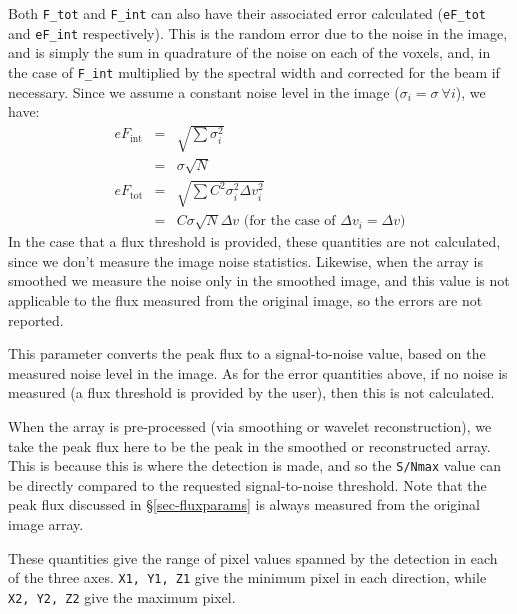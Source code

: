 
Both \texttt{F\_tot} and \texttt{F\_int} can also have their
associated error calculated (\texttt{eF\_tot} and \texttt{eF\_int}
respectively). This is the random error due to the noise in the image,
and is simply the sum in quadrature of the noise on each of the
voxels, and, in the case of \texttt{F\_int} multiplied by the spectral
width and corrected for the beam if necessary. Since we assume a
constant noise level in the image ($\sigma_i=\sigma\  \forall i$), we
have:
\begin{eqnarray*}
eF_\text{int} &= & \sqrt{\sum\sigma_i^2} \\&= &\sigma \sqrt{N}\\
eF_\text{tot} &= & \sqrt{\sum C^2\sigma_i^2 \Delta v_i^2} \\&= &C \sigma
\sqrt{N} \Delta v \text{ (for the case of $\Delta v_i = \Delta v$)}
\end{eqnarray*}
In the case that a flux threshold is provided, these quantities are
not calculated, since we don't measure the image noise
statistics. Likewise, when the array is smoothed we measure the noise
only in the smoothed image, and this value is not applicable to the
flux measured from the original image, so the errors are not
reported. 



This parameter converts the peak flux to a signal-to-noise value,
based on the measured noise level in the image. As for the error
quantities above, if no noise is measured (\ie a flux threshold is
provided by the user), then this is not calculated.

When the array is pre-processed (via smoothing or wavelet
reconstruction), we take the peak flux here to be the peak in the
smoothed or reconstructed array. This is because this is where the
detection is made, and so the \texttt{S/Nmax} value can be directly
compared to the requested signal-to-noise threshold. Note that the
peak flux discussed in \S\ref{sec-fluxparams} is always measured from
the original image array.


These quantities give the range of pixel values spanned by the
detection in each of the three axes. \texttt{X1, Y1, Z1} give the
minimum pixel in each direction, while \texttt{X2, Y2, Z2} give the
maximum pixel.


